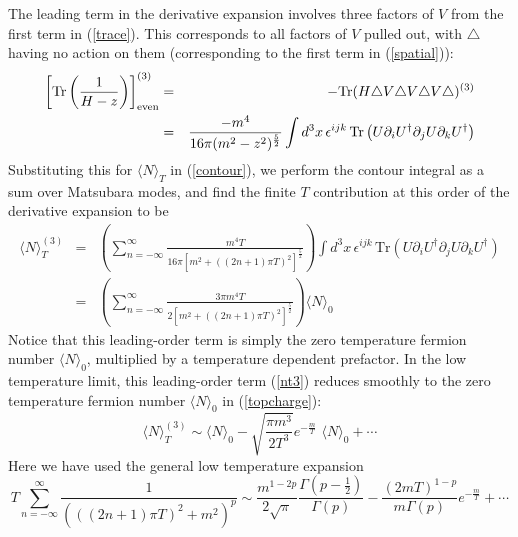\documentclass[a4paper,prd,showpacs,showkeys]{revtex4}
\begin{document}
The leading term in the derivative expansion involves three factors of $V$ from the first term in (\ref{trace}). This corresponds to all factors of $V$ pulled out, with $\triangle$ having no action on them (corresponding to the first term in (\ref{spatial})):
\begin{eqnarray}
\left[\textrm{Tr}\left(\frac{1}{H-z}\right)\right]^{(3)} _{\rm{even}}&=& -\textrm{Tr} (H \triangle V \triangle V \triangle V \triangle)^{(3)}\nonumber \\
&=&\frac{-m^4}{16 \pi (m^{2} -z^{2})^{\frac{5}{2}}} \int d^3 x \, \epsilon^{ijk} \, \textrm{Tr} \left(U \partial _i U^{\dagger} \partial _j U \partial _k U^{\dagger} \right)
\end{eqnarray}
Substituting this for $\langle N \rangle _T$ in (\ref{contour}), we perform the contour integral as a sum over Matsubara modes, and find the finite $T$ contribution at this order of the derivative expansion to be
\begin{eqnarray}
\langle N \rangle _T ^{(3)} &=&\left(\sum_{n=-\infty}^\infty \frac{m^4 T}{16 \pi \left[m^2 +((2n +1)\pi T)^2\right]^{\frac{5}{2}}} \right) \int d^3 x \, \epsilon^{ijk}\,  \textrm{Tr} \left(U \partial _i U^{\dagger} \partial _j U \partial _k U^{\dagger} \right) \nonumber \\
 & = & \left(\sum_{n=-\infty}^\infty \frac{3 \pi m^4 T}{2 \left[m^2 +((2n+1)\pi T)^2\right]^{\frac{5}{2}}} \right) \langle N\rangle _0
\label{nt3}
\end{eqnarray}
Notice that this leading-order term is simply the zero temperature fermion number $\langle N\rangle_0$, multiplied by a  temperature dependent prefactor. In the low temperature limit, this leading-order term (\ref{nt3}) reduces smoothly to the zero temperature fermion number $\langle N\rangle_0$ in (\ref{topcharge}):
\begin{equation}
\langle N\rangle _T ^{(3)}\sim \langle N\rangle _0 -\sqrt{\frac{\pi m^3}{2T^3}}e^{-\frac{m}{T}}\, \, \langle N\rangle _0 + \cdots
\label{leading}
\end{equation}
Here we have used the general low temperature expansion
\begin{equation}
T\sum_{n=-\infty}^\infty \frac{1}{(((2n+1)\pi T)^{2}+m^{2})^{p}} \sim 
\frac{m^{1-2p}}{2\sqrt{\pi}} \frac{\Gamma (p-\frac{1}{2})}{\Gamma
(p)}-\frac{(2mT)^{1-p}}{m\Gamma (p)} e^{-\frac{m}{T}}+ \cdots 
\label{identity}
\end{equation}
\end{document}
